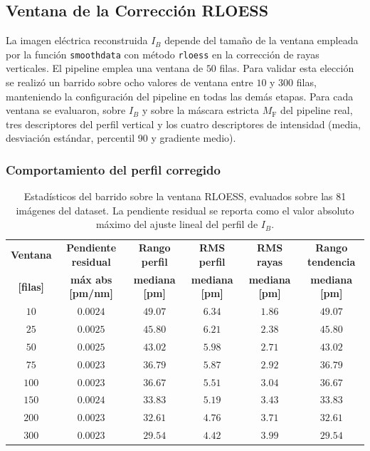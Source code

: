 \subsection{Ventana de la Corrección RLOESS}
\label{sec:ventana_rloess}
 
La imagen eléctrica reconstruida $I_B$ depende del tamaño de la ventana empleada por la función \texttt{smoothdata} con método \texttt{rloess} en la corrección de rayas verticales. El pipeline emplea una ventana de $50$ filas. Para validar esta elección se realizó un barrido sobre ocho valores de ventana entre $10$ y $300$ filas, manteniendo la configuración del pipeline en todas las demás etapas. Para cada ventana se evaluaron, sobre $I_B$ y sobre la máscara estricta $M_{\mathrm{F}}$ del pipeline real, tres descriptores del perfil vertical y los cuatro descriptores de intensidad (media, desviación estándar, percentil 90 y gradiente medio).
 
\subsubsection*{Comportamiento del perfil corregido}
 
\begin{table}[H]
\centering
\caption{Estadísticos del barrido sobre la ventana RLOESS, evaluados sobre las 81 imágenes del dataset. La pendiente residual se reporta como el valor absoluto máximo del ajuste lineal del perfil de $I_B$.}
\label{tab:barrido_rloess}
\small
\begin{tabular}{cccccc}
\toprule
\textbf{Ventana} & \textbf{Pendiente residual} & \textbf{Rango perfil} & \textbf{RMS perfil} & \textbf{RMS rayas} & \textbf{Rango tendencia} \\
\textbf{[filas]} & \textbf{máx abs [pm/nm]} & \textbf{mediana [pm]} & \textbf{mediana [pm]} & \textbf{mediana [pm]} & \textbf{mediana [pm]} \\
\midrule
$10$  & $0.0024$ & $49.07$ & $6.34$ & $1.86$ & $49.07$ \\
$25$  & $0.0025$ & $45.80$ & $6.21$ & $2.38$ & $45.80$ \\
$50$  & $0.0025$ & $43.02$ & $5.98$ & $2.71$ & $43.02$ \\
$75$  & $0.0023$ & $36.79$ & $5.87$ & $2.92$ & $36.79$ \\
$100$ & $0.0023$ & $36.67$ & $5.51$ & $3.04$ & $36.67$ \\
$150$ & $0.0024$ & $33.83$ & $5.19$ & $3.43$ & $33.83$ \\
$200$ & $0.0023$ & $32.61$ & $4.76$ & $3.71$ & $32.61$ \\
$300$ & $0.0023$ & $29.54$ & $4.42$ & $3.99$ & $29.54$ \\
\bottomrule
\end{tabular}
\end{table}
 
